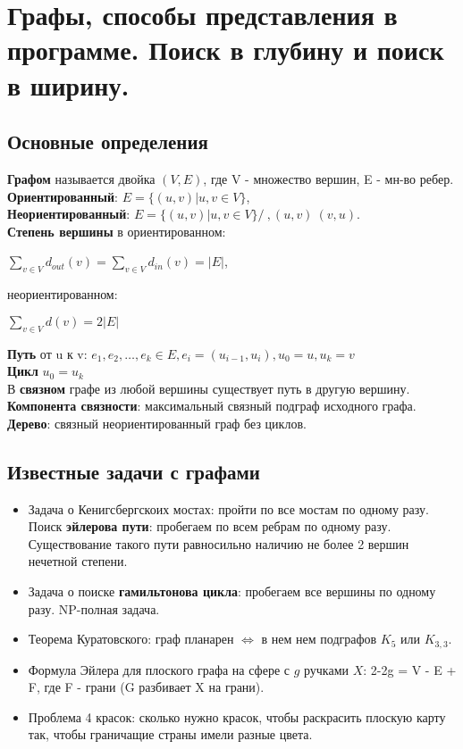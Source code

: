 \section {Графы, способы представления в программе. Поиск в глубину и поиск в ширину.}

\subsection* {Основные определения}

 {\bf Графом} называется двойка $(V, E)$, где V - множество вершин, E - мн-во ребер.\\
{\bf Ориентированный}: $E = \{(u,v) | u,v \in V\}$,\\
{\bf Неориентированный}: $E = \{(u,v) | u,v \in V\}/~, (u,v) ~ (v,u)$.\\
{\bf Степень вершины} в ориентированном:\begin{center} $\sum_{v\in V}d_{out}(v) = \sum_{v\in V}d_{in}(v) = |E|$, \end{center}
неориентированном: \begin{center} $\sum_{v\in V}d(v) = 2|E|$ \end{center}
{\bf Путь} от u к v: $e_1,e_2,\dots, e_k \in E, e_i = (u_{i-1}, u_i), u_0 = u, u_k = v$\\
{\bf Цикл}  $u_0 = u_k$\\
В {\bf связном} графе из любой вершины существует путь в другую вершину.\\
{\bf  Компонента связности}: максимальный связный подграф исходного графа.\\
{\bf Дерево}: связный неориентированный граф без циклов.


\subsection* {Известные задачи с графами}
\begin{itemize}
\item Задача о Кенигсбергскоих мостах: пройти по все мостам по одному разу. Поиск {\bf эйлерова пути}: пробегаем по всем ребрам по одному разу. Существование такого пути равносильно наличию не более 2 вершин нечетной степени.
\item Задача о поиске {\bf гамильтонова цикла}: пробегаем все вершины по одному разу. NP-полная задача.
\item Теорема Куратовского: граф планарен $\Leftrightarrow$ в нем нем подграфов $K_5$ или $K_{3,3}$.
\item Формула Эйлера для плоского графа на сфере с $g$ ручками $X$: 2-2g = V - E + F, где F - грани (G разбивает X на грани).
\item Проблема 4 красок: сколько нужно красок, чтобы раскрасить плоскую карту так, чтобы граничащие страны имели разные цвета.
\end{itemize}


